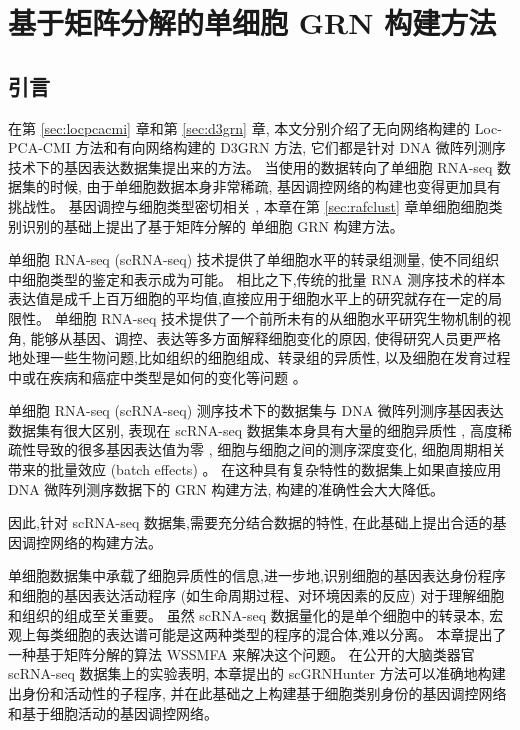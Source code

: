 \section{基于矩阵分解的单细胞 GRN 构建方法}
\label{sec:scgrnhunter}

\subsection{引言}

在第 \ref{sec:locpcacmi} 章和第 \ref{sec:d3grn} 章, 本文分别介绍了无向网络构建的 Loc-PCA-CMI 方法和有向网络构建的 D3GRN 方法, 
它们都是针对 DNA 微阵列测序技术下的基因表达数据集提出来的方法。
当使用的数据转向了单细胞 RNA-seq 数据集的时候, 
由于单细胞数据本身非常稀疏, 基因调控网络的构建也变得更加具有挑战性。
基因调控与细胞类型密切相关 , 
本章在第 \ref{sec:rafclust} 章单细胞细胞类别识别的基础上提出了基于矩阵分解的
单细胞 GRN 构建方法。


单细胞 RNA-seq (scRNA-seq) 技术提供了单细胞水平的转录组测量, 
使不同组织中细胞类型的鉴定和表示成为可能。
相比之下,传统的批量 RNA 测序技术的样本表达值是成千上百万细胞的平均值,直接应用于细胞水平上的研究就存在一定的局限性。
单细胞 RNA-seq 技术提供了一个前所未有的从细胞水平研究生物机制的视角,
能够从基因、调控、表达等多方面解释细胞变化的原因,
使得研究人员更严格地处理一些生物问题,比如组织的细胞组成、转录组的异质性,
以及细胞在发育过程中或在疾病和癌症中类型是如何的变化等问题 。

单细胞 RNA-seq (scRNA-seq) 测序技术下的数据集与 DNA 微阵列测序基因表达数据集有很大区别, 
表现在 scRNA-seq 数据集本身具有大量的细胞异质性 ,
高度稀疏性导致的很多基因表达值为零 ,
细胞与细胞之间的测序深度变化, 细胞周期相关带来的批量效应 (batch effects) 。
在这种具有复杂特性的数据集上如果直接应用 DNA 微阵列测序数据下的 GRN 构建方法,
构建的准确性会大大降低。

因此,针对 scRNA-seq 数据集,需要充分结合数据的特性,
在此基础上提出合适的基因调控网络的构建方法。

单细胞数据集中承载了细胞异质性的信息,进一步地,识别细胞的基因表达身份程序和细胞的基因表达活动程序 (如生命周期过程、对环境因素的反应) 
对于理解细胞和组织的组成至关重要。
虽然 scRNA-seq 数据量化的是单个细胞中的转录本,
宏观上每类细胞的表达谱可能是这两种类型的程序的混合体,难以分离。
本章提出了一种基于矩阵分解的算法 WSSMFA 来解决这个问题。
在公开的大脑类器官 scRNA-seq 数据集上的实验表明,
本章提出的 scGRNHunter 方法可以准确地构建出身份和活动性的子程序, 
并在此基础之上构建基于细胞类别身份的基因调控网络和基于细胞活动的基因调控网络。

